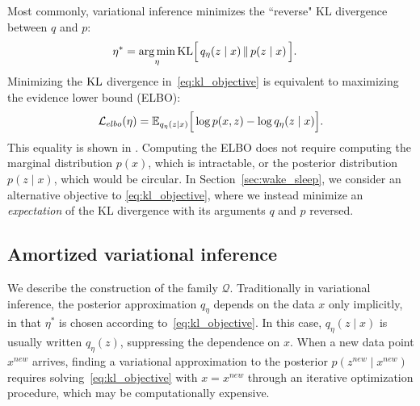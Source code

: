 %
Most commonly, variational inference minimizes the ``reverse" KL divergence
between $q$ and $p$:
\begin{align}
   \eta^* &= \operatorname*{arg\,min}_{\eta} \mathrm{KL}\Big[\,q_\eta(z \mid x)\, \| \,p(z \mid x)\,\Big].
   \label{eq:kl_objective}
\end{align}
Minimizing the $\textrm{KL}$ divergence in~\eqref{eq:kl_objective} is equivalent to maximizing the evidence lower bound (ELBO):
\begin{align}
    \mathcal{L}_{elbo}(\eta) =
    \mathbb{E}_{q_\eta(z \mid x)}\Big[\log p(x, z) - \log q_\eta(z \mid x)\Big].
    \label{eq:elbo}
\end{align}
This equality is shown in \cite{Blei_2017_vi_review}. Computing the ELBO does not require computing the marginal distribution $p(x)$, which is intractable, or the posterior distribution $p(z \mid x)$, which would be circular.
In Section~\ref{sec:wake_sleep}, we
consider an alternative objective to \eqref{eq:kl_objective},
where we instead minimize an \textit{expectation}
of the KL divergence with its arguments $q$ and $p$ reversed.


\subsection{Amortized variational inference}
We describe the construction of the family $\mathcal{Q}$. 
Traditionally in variational inference, the posterior approximation $q_\eta$ depends on the data $x$ only implicitly,
in that $\eta^*$ is chosen according to~\eqref{eq:kl_objective}.
In this case, $q_\eta(z \mid x)$ is usually written $q_\eta(z)$, suppressing the dependence on $x$.
When a new data point $x^{new}$ arrives, finding a variational  approximation to the posterior $p(z^{new} \mid x^{new})$ requires solving~\eqref{eq:kl_objective} with $x = x^{new}$ through an iterative optimization procedure, which may be computationally expensive.


